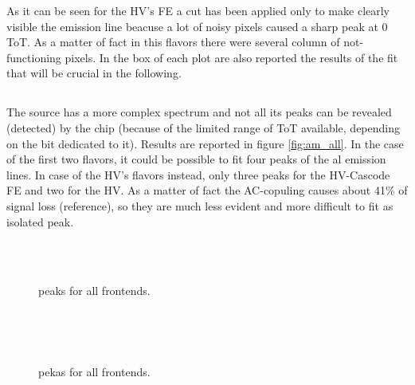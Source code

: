 As it can be seen for the HV's FE a cut has been applied only to make clearly visible the emission line beacuse a lot of noisy pixels caused a sharp peak at 0 ToT. As a matter of fact in this flavors there were several column of not-functioning pixels. In the box of each plot are also reported the results of the fit that will be crucial in the following.


\subsection{}

The  source has a more complex spectrum and not all its peaks can be revealed (detected) by the chip (because of the limited range of ToT available, depending on the bit dedicated to it). Results are reported in figure \vref{fig:am_all}. In the case of the first two flavors, it could be possible to fit four peaks of the al emission lines. In case of the HV's flavors instead, only three peaks for the HV-Cascode FE and two for the HV. As a matter of fact the AC-copuling causes about 41\% of signal loss (reference), so they are much less evident and more difficult to fit as isolated peak.


\begin{figure}[h!]
\centering
{}\quad
{}\\
\quad
{}\\
\caption{ peaks for all frontends.}
\label{fig:am_all}
\end{figure}

\subsection{}



\begin{figure}[h!]
\centering
{}\quad
{}\\
\quad
{}\\
\caption{ pekas for all frontends.}
\label{fig:fe_all}
\end{figure}

